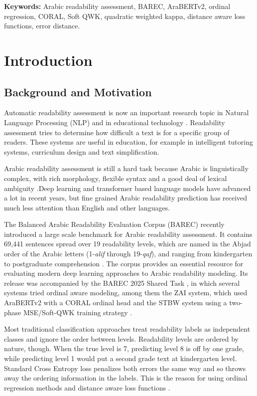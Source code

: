 \documentclass[12pt]{report}
\begin{document}
{\textbf{Keywords:}} Arabic readability assessment, BAREC, AraBERTv2, ordinal regression, CORAL, Soft QWK, quadratic weighted kappa, distance aware loss functions, error distance.




\tableofcontents


\chapter{Introduction}\label{chap:introduction}
\section{Background and Motivation}

Automatic readability assessment is now an important research topic in Natural Language Processing (NLP) and in educational technology \cite{dubay2004principles}. Readability assessment tries to determine how difficult a text is for a specific group of readers. These systems are useful in education, for example in intelligent tutoring systems, curriculum design and text simplification\cite{vajjala2022trends}.

Arabic readability assessment is still a hard task because Arabic is linguistically complex, with rich morphology, flexible syntax and a good deal of lexical ambiguity \cite{nassiri2023approaches}.Deep learning and transformer based language models have advanced a lot in recent years, but fine grained Arabic readability prediction has received much less attention than English and other languages.

The Balanced Arabic Readability Evaluation Corpus (BAREC) recently introduced a large scale benchmark for Arabic readability assessment. It contains 69,441 sentences spread over 19 readability levels, which are named in the Abjad order of the Arabic letters (1-\textit{alif} through 19-\textit{qaf}), and ranging from kindergarten to postgraduate comprehension \cite{elmadani2025barec}. The corpus provides an essential resource for evaluating modern deep learning approaches to Arabic readability modeling. Its release was accompanied by the BAREC 2025 Shared Task \cite{elmadani2025sharedtask}, in which several systems tried ordinal aware modeling, among them the ZAI system, which used AraBERTv2 with a CORAL ordinal head\cite{nazzal2025zai} and the STBW system using a two-phase MSE/Soft-QWK training strategy \cite{trigui2025stbw}.

Most traditional classification approaches treat readability labels as independent classes and ignore the order between levels. Readability levels are ordered by nature, though. When the true level is 7, predicting level 8 is off by one grade, while predicting level 1 would put a second grade text at kindergarten level. Standard Cross Entropy loss penalizes both errors the same way and so throws away the ordering information in the labels. This is the reason for using ordinal regression methods and distance aware loss functions \cite{castagnos2022ordinal}.
\end{document}
